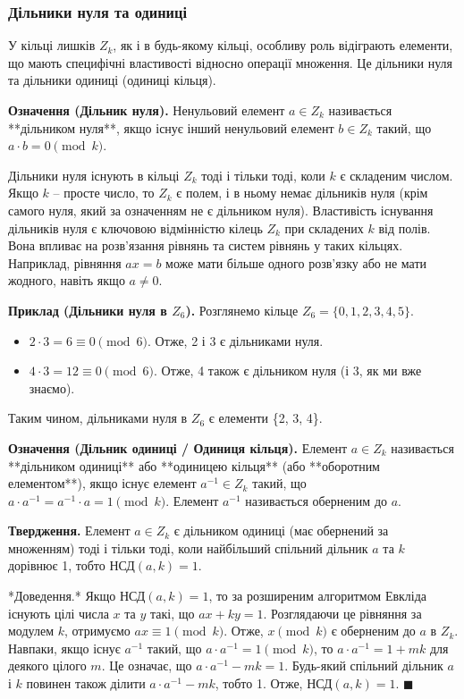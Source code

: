 \documentclass[a4paper,12pt]{article}
\begin{document}
    \subsubsection{Дільники нуля та одиниці} %
    У кільці лишків \(Z_k\), як і в будь-якому кільці, особливу роль відіграють елементи, що мають специфічні властивості відносно операції множення. Це дільники нуля та дільники одиниці (одиниці кільця).

    \textbf{Означення (Дільник нуля).} Ненульовий елемент \(a \in Z_k\) називається **дільником нуля**, якщо існує інший ненульовий елемент \(b \in Z_k\) такий, що \(a \cdot b = 0 \pmod k\).

    Дільники нуля існують в кільці \(Z_k\) тоді і тільки тоді, коли \(k\) є складеним числом. Якщо \(k\) -- просте число, то \(Z_k\) є полем, і в ньому немає дільників нуля (крім самого нуля, який за означенням не є дільником нуля).
    Властивість існування дільників нуля є ключовою відмінністю кілець \(Z_k\) при складених \(k\) від полів. Вона впливає на розв'язання рівнянь та систем рівнянь у таких кільцях. Наприклад, рівняння \(ax = b\) може мати більше одного розв'язку або не мати жодного, навіть якщо \(a \ne 0\).

    \textbf{Приклад (Дільники нуля в \(Z_6\)).} Розглянемо кільце \(Z_6 = \{0, 1, 2, 3, 4, 5\}\).
    \begin{itemize}
        \item \(2 \cdot 3 = 6 \equiv 0 \pmod 6\). Отже, 2 і 3 є дільниками нуля.
        \item \(4 \cdot 3 = 12 \equiv 0 \pmod 6\). Отже, 4 також є дільником нуля (і 3, як ми вже знаємо).
    \end{itemize}
    Таким чином, дільниками нуля в \(Z_6\) є елементи \{2, 3, 4\}.

    \textbf{Означення (Дільник одиниці / Одиниця кільця).} Елемент \(a \in Z_k\) називається **дільником одиниці** або **одиницею кільця** (або **оборотним елементом**), якщо існує елемент \(a^{-1} \in Z_k\) такий, що \(a \cdot a^{-1} = a^{-1} \cdot a = 1 \pmod k\). Елемент \(a^{-1}\) називається оберненим до \(a\).

    \textbf{Твердження.} Елемент \(a \in Z_k\) є дільником одиниці (має обернений за множенням) тоді і тільки тоді, коли найбільший спільний дільник \(a\) та \(k\) дорівнює 1, тобто НСД\((a, k) = 1\).

    *Доведення.* Якщо НСД\((a, k) = 1\), то за розширеним алгоритмом Евкліда існують цілі числа \(x\) та \(y\) такі, що \(ax + ky = 1\). Розглядаючи це рівняння за модулем \(k\), отримуємо \(ax \equiv 1 \pmod k\). Отже, \(x \pmod k\) є оберненим до \(a\) в \(Z_k\). Навпаки, якщо існує \(a^{-1}\) такий, що \(a \cdot a^{-1} = 1 \pmod k\), то \(a \cdot a^{-1} = 1 + mk\) для деякого цілого \(m\). Це означає, що \(a \cdot a^{-1} - mk = 1\). Будь-який спільний дільник \(a\) і \(k\) повинен також ділити \(a \cdot a^{-1} - mk\), тобто 1. Отже, НСД\((a, k) = 1\). \(\blacksquare\)
\end{document}
